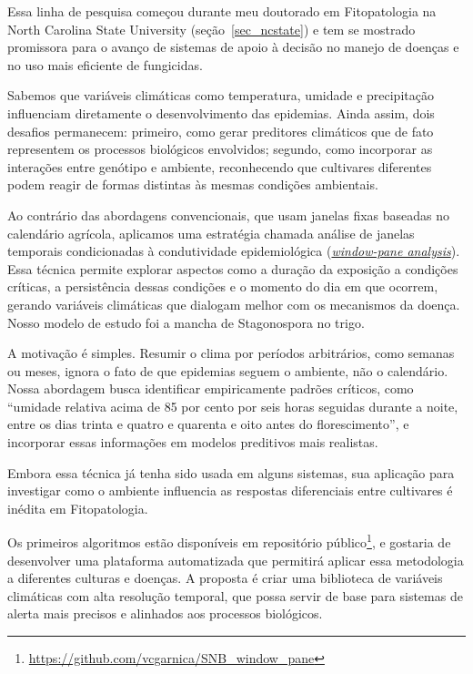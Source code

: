 \documentclass[12pt,a4paper,oneside]{book}
\newcommand{\NCState}{North Carolina State University}
\begin{document}
Essa linha de pesquisa começou durante meu doutorado em Fitopatologia na \NCState{} (seção~\ref{sec_ncstate}) e 
tem se mostrado promissora para o avanço de sistemas de apoio à decisão no manejo de doenças e no uso mais eficiente de fungicidas.

Sabemos que variáveis climáticas como temperatura, umidade e precipitação influenciam diretamente o 
desenvolvimento das epidemias. Ainda assim, dois desafios permanecem: primeiro, como gerar preditores 
climáticos que de fato representem os processos biológicos envolvidos; segundo, como incorporar as 
interações entre genótipo e ambiente, reconhecendo que cultivares diferentes podem reagir de formas distintas às mesmas condições
ambientais.

Ao contrário das abordagens convencionais, que usam janelas fixas baseadas no calendário agrícola, 
aplicamos uma estratégia chamada análise de janelas temporais condicionadas à condutividade 
epidemiológica (\href{https://apsjournals.apsnet.org/doi/full/10.1094/PDIS-05-20-0952-RE}{\textit{window-pane analysis}}). Essa 
técnica permite explorar aspectos como a duração da exposição a condições críticas, a persistência dessas condições e o
momento do dia em que ocorrem, gerando variáveis climáticas que dialogam melhor com os mecanismos da doença. Nosso modelo 
de estudo foi a mancha de Stagonospora no trigo.

A motivação é simples. Resumir o clima por períodos arbitrários, como semanas ou meses, ignora o fato de que epidemias 
seguem o ambiente, não o calendário. Nossa abordagem busca identificar empiricamente padrões críticos, como “umidade 
relativa acima de 85 por cento por seis horas seguidas durante a noite, entre os dias trinta e quatro e quarenta e oito
antes do florescimento”, e incorporar essas informações em modelos preditivos mais realistas.

Embora essa técnica já tenha sido usada em alguns sistemas, sua aplicação para investigar como o ambiente influencia 
as respostas diferenciais entre cultivares é inédita em Fitopatologia.

Os primeiros algoritmos estão disponíveis em repositório público\footnote{\url{https://github.com/vcgarnica/SNB_window_pane}}, e 
gostaria de desenvolver uma plataforma automatizada que permitirá aplicar essa metodologia a diferentes culturas e doenças. A 
proposta é criar uma biblioteca de variáveis climáticas com alta resolução temporal, que possa servir de base para sistemas de 
alerta mais precisos e alinhados aos processos biológicos.
\end{document}
